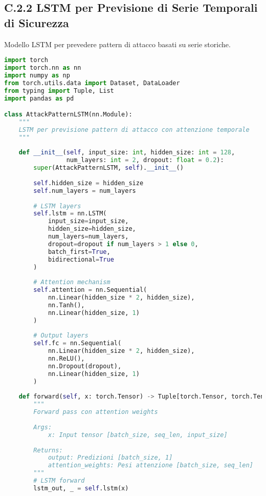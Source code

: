 \subsection{C.2.2 LSTM per Previsione di Serie Temporali di Sicurezza}

Modello LSTM per prevedere pattern di attacco basati su serie storiche.

\begin{lstlisting}[language=Python, caption=LSTM per Previsione Pattern di Attacco]
import torch
import torch.nn as nn
import numpy as np
from torch.utils.data import Dataset, DataLoader
from typing import Tuple, List
import pandas as pd

class AttackPatternLSTM(nn.Module):
    """
    LSTM per previsione pattern di attacco con attenzione temporale
    """
    
    def __init__(self, input_size: int, hidden_size: int = 128, 
                 num_layers: int = 2, dropout: float = 0.2):
        super(AttackPatternLSTM, self).__init__()
        
        self.hidden_size = hidden_size
        self.num_layers = num_layers
        
        # LSTM layers
        self.lstm = nn.LSTM(
            input_size=input_size,
            hidden_size=hidden_size,
            num_layers=num_layers,
            dropout=dropout if num_layers > 1 else 0,
            batch_first=True,
            bidirectional=True
        )
        
        # Attention mechanism
        self.attention = nn.Sequential(
            nn.Linear(hidden_size * 2, hidden_size),
            nn.Tanh(),
            nn.Linear(hidden_size, 1)
        )
        
        # Output layers
        self.fc = nn.Sequential(
            nn.Linear(hidden_size * 2, hidden_size),
            nn.ReLU(),
            nn.Dropout(dropout),
            nn.Linear(hidden_size, 1)
        )
        
    def forward(self, x: torch.Tensor) -> Tuple[torch.Tensor, torch.Tensor]:
        """
        Forward pass con attention weights
        
        Args:
            x: Input tensor [batch_size, seq_len, input_size]
            
        Returns:
            output: Predizioni [batch_size, 1]
            attention_weights: Pesi attenzione [batch_size, seq_len]
        """
        # LSTM forward
        lstm_out, _ = self.lstm(x)
        

\end{lstlisting}
